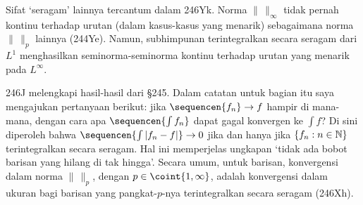 {Sifat `seragam' lainnya tercantum dalam 246Yk. Norma $\|\,\|_{\infty}$ tidak
pernah kontinu terhadap urutan (dalam kasus-kasus yang menarik) sebagaimana
norma $\|\,\|_p$ lainnya (244Ye). Namun, subhimpunan terintegralkan secara
seragam dari $L^1$ menghasilkan seminorma-seminorma kontinu terhadap urutan
yang menarik pada $L^{\infty}$.

246J melengkapi hasil-hasil dari \S245. Dalam catatan untuk bagian itu saya
mengajukan pertanyaan berikut: jika $\sequencen{f_n}\to f$ hampir di mana-mana,
dengan cara apa $\sequencen{\int f_n}$ dapat gagal konvergen ke $\int f$?
Di sini diperoleh bahwa $\sequencen{\int|f_n-f|}\to 0$ jika dan hanya jika
$\{f_n:n\in\Bbb N\}$ terintegralkan secara seragam. Hal ini memperjelas
ungkapan `tidak ada bobot barisan yang hilang di tak hingga'. Secara umum,
untuk barisan, konvergensi dalam norma $\|\,\|_p$, dengan
$p\in\coint{1,\infty}$, adalah konvergensi dalam ukuran bagi barisan yang pangkat-$p$-nya
terintegralkan secara seragam (246Xh).




}%

\discrpage
